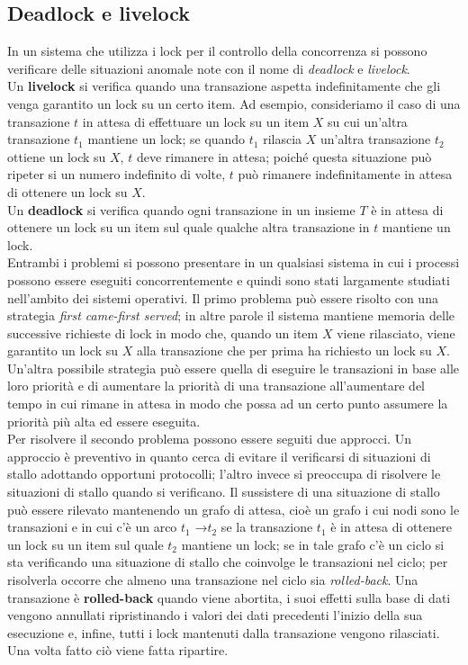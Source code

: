 \subsection{Deadlock e livelock}
In un sistema che utilizza i lock per il controllo della concorrenza si possono verificare delle
situazioni anomale note con il nome di \emph{deadlock} e \emph{livelock}.\\
Un \textbf{livelock} si verifica quando una transazione aspetta indefinitamente che gli venga garantito un
lock su un certo item. Ad esempio, consideriamo il caso di una transazione $t$ in attesa di effettuare
un lock su un item $X$ su cui un'altra transazione $t_1$ mantiene un lock; se quando $t_1$ rilascia $X$
un'altra transazione $t_2$ ottiene un lock su $X$, $t$ deve rimanere in attesa; poiché questa situazione può
ripeter si un numero indefinito di volte, $t$ può rimanere indefinitamente in attesa di ottenere un lock
su $X$.\\
Un \textbf{deadlock} si verifica quando ogni transazione in un insieme $T$ è in attesa di ottenere un lock su
un item sul quale qualche altra transazione in $t$ mantiene un lock.\\
Entrambi i problemi si possono presentare in un qualsiasi sistema in cui i processi possono essere
eseguiti concorrentemente e quindi sono stati largamente studiati nell'ambito dei sistemi operativi.
Il primo problema può essere risolto con una strategia \emph{first came-first served}; in altre parole il
sistema mantiene memoria delle successive richieste di lock in modo che, quando un item $X$ viene
rilasciato, viene garantito un lock su $X$ alla transazione che per prima ha richiesto un lock su $X$.
Un'altra possibile strategia può essere quella di eseguire le transazioni in base alle loro priorità e di
aumentare la priorità di una transazione all'aumentare del tempo in cui rimane in attesa in modo che
possa ad un certo punto assumere la priorità più alta ed essere eseguita.\\
Per risolvere il secondo problema possono essere seguiti due approcci. Un approccio è preventivo in
quanto cerca di evitare il verificarsi di situazioni di stallo adottando opportuni protocolli; l'altro
invece si preoccupa di risolvere le situazioni di stallo quando si verificano. Il sussistere di una
situazione di stallo può essere rilevato mantenendo un grafo di attesa, cioè un grafo i cui nodi sono
le transazioni e in cui c'è un arco $t_1$ →$t_2$ se la transazione $t_1$ è in attesa di ottenere un lock su un
item sul quale $t_2$ mantiene un lock; se in tale grafo c'è un ciclo si sta verificando una situazione di
stallo che coinvolge le transazioni nel ciclo; per risolverla occorre che almeno una transazione nel
ciclo sia \emph{rolled-back}. Una transazione è \textbf{rolled-back} quando viene abortita, 
i suoi effetti sulla base di dati vengono annullati ripristinando i valori dei dati precedenti 
l'inizio della sua esecuzione e, infine, tutti i lock mantenuti dalla transazione vengono rilasciati.
Una volta fatto ciò viene fatta ripartire.

